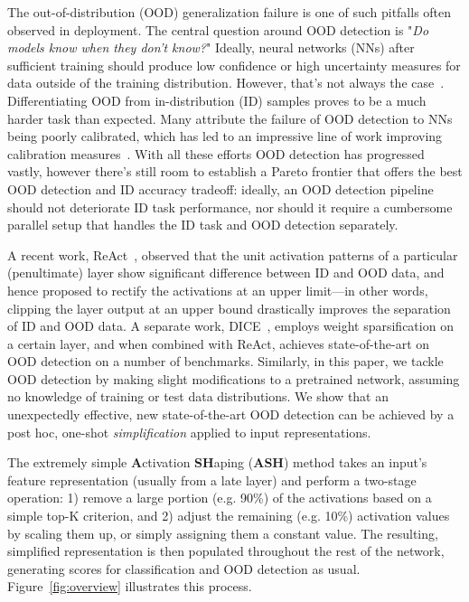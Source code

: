 \documentclass{article}
\newcommand{\figref}[1]{Figure~\ref{fig:#1}}
\begin{document}
The out-of-distribution (OOD) generalization failure is one of such pitfalls often observed in deployment. 
The central question around OOD detection is "\emph{Do models know when they don't know?}" Ideally, neural networks (NNs) after sufficient training should produce low confidence or high uncertainty measures for data outside of the training distribution.
However, that's not always the case~\citep{szegedy2013intriguing, moosavi2017universal, hendrycks17baseline, Nguyen2015, amodei2016concrete}.
Differentiating OOD from in-distribution (ID) samples proves to be a much harder task than expected.
Many attribute the failure of OOD detection to NNs being poorly calibrated, which has led to an impressive line of work improving calibration measures~\citep{guo2017calibration, NIPS2017_9ef2ed4b, minderer2021revisiting}. With all these efforts OOD detection has progressed vastly, however there's still room to establish a Pareto frontier that offers the best OOD detection and ID accuracy tradeoff: ideally, an OOD detection pipeline should not deteriorate ID task performance, nor should it require a cumbersome parallel setup that handles the ID task and OOD detection separately. 

A recent work, ReAct~\citep{react}, observed that the unit activation patterns of a particular (penultimate) layer show significant difference between ID and OOD data, and hence proposed to rectify the activations at an upper limit---in other words, clipping the layer output at an upper bound drastically improves the separation of ID and OOD data. A separate work, DICE~\citep{sun2022dice}, employs weight sparsification on a certain layer, and when combined with ReAct, achieves state-of-the-art on OOD detection on a number of benchmarks. Similarly, in this paper, we tackle OOD detection by making slight modifications to a pretrained network, assuming no knowledge of training or test data distributions. We show that an unexpectedly effective, new state-of-the-art OOD detection can be achieved by a post hoc, one-shot \emph{simplification} applied to input representations. 

The extremely simple \textbf{A}ctivation \textbf{SH}aping (\textbf{ASH}) method takes an input's feature representation (usually from a late layer) and perform a two-stage operation: 1) remove a large portion (e.g. 90\%) of the activations based on a simple top-K criterion, and 2) adjust the remaining (e.g. 10\%) activation values by scaling them up, or simply assigning them a constant value. The resulting, simplified representation is then populated throughout the rest of the network, generating scores for classification and OOD detection as usual. \figref{overview} illustrates this process.
\end{document}
